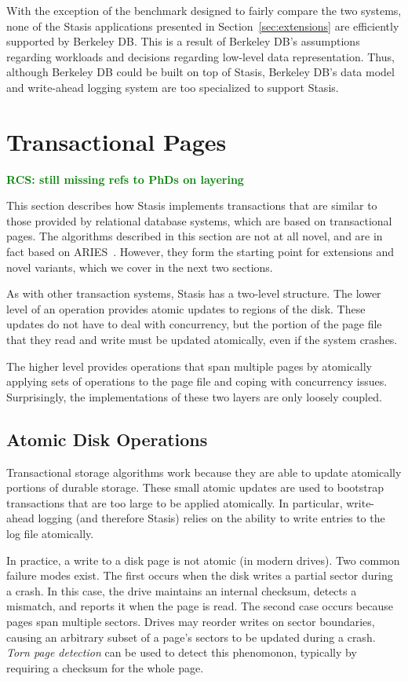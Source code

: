 \documentclass[letterpaper,twocolumn,10pt]{article}
\newcommand{\yad}{Stasis\xspace}
\newcommand{\rcs}[1]{\textcolor{green}{\bf RCS: #1}}
\begin{document}
With the exception of the benchmark designed to fairly compare the two
systems, none of the \yad applications presented in
Section~\ref{sec:extensions} are efficiently supported by Berkeley DB.
This is a result of Berkeley DB's assumptions regarding workloads and
decisions regarding low-level data representation.  Thus, although
Berkeley DB could be built on top of \yad, Berkeley DB's data model
and write-ahead logging system are too specialized to support \yad.




\section{Transactional Pages}

\rcs{still missing refs to PhDs on layering}

This section describes how \yad implements transactions that are
similar to those provided by relational database systems, which are
based on transactional pages.  The algorithms described in this
section are not at all novel, and are in fact based on
ARIES~\cite{aries}.  However, they form the starting point for
extensions and novel variants, which we cover in the next two
sections.

As with other transaction systems, \yad has a two-level structure.
The lower level of an operation provides atomic
updates to regions of the disk.  These updates do not have to deal
with concurrency, but the portion of the page file that they read and
write must be updated atomically, even if the system crashes.

The higher level provides operations that span multiple pages by
atomically applying sets of operations to the page file and coping
with concurrency issues.  Surprisingly, the implementations of these
two layers are only loosely coupled.


\subsection{Atomic Disk Operations}

Transactional storage algorithms work because they are able to
update atomically portions of durable storage.  These small atomic
updates are used to bootstrap transactions that are too large to be
applied atomically.  In particular, write-ahead logging (and therefore
\yad) relies on the ability to write entries to the log
file atomically.

In practice, a write to a disk page is not atomic (in modern drives).  Two common failure
modes exist.  The first occurs when the disk writes a partial sector
during a crash.  In this case, the drive maintains an internal
checksum, detects a mismatch, and reports it when the page is read.
The second case occurs because pages span multiple sectors.  Drives
may reorder writes on sector boundaries, causing an arbitrary subset
of a page's sectors to be updated during a crash.  {\em Torn page
detection} can be used to detect this phenomonon, typically by
requiring a checksum for the whole page. 
\end{document}
